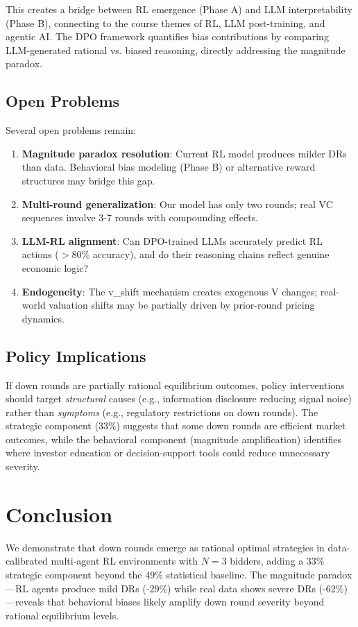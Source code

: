\documentclass[11pt,a4paper]{article}
\begin{document}
This creates a bridge between RL emergence (Phase A) and LLM interpretability (Phase B), connecting to the course themes of RL, LLM post-training, and agentic AI. The DPO framework quantifies bias contributions by comparing LLM-generated rational vs. biased reasoning, directly addressing the magnitude paradox.

\subsection{Open Problems}

Several open problems remain:
\begin{enumerate}[nosep]
  \item \textbf{Magnitude paradox resolution}: Current RL model produces milder DRs than data. Behavioral bias modeling (Phase B) or alternative reward structures may bridge this gap.
  \item \textbf{Multi-round generalization}: Our model has only two rounds; real VC sequences involve 3-7 rounds with compounding effects.
  \item \textbf{LLM-RL alignment}: Can DPO-trained LLMs accurately predict RL actions ($>80\%$ accuracy), and do their reasoning chains reflect genuine economic logic?
  \item \textbf{Endogeneity}: The v\_shift mechanism creates exogenous V changes; real-world valuation shifts may be partially driven by prior-round pricing dynamics.
\end{enumerate}

\subsection{Policy Implications}

If down rounds are partially rational equilibrium outcomes, policy interventions should target \emph{structural} causes (e.g., information disclosure reducing signal noise) rather than \emph{symptoms} (e.g., regulatory restrictions on down rounds). The strategic component (33\%) suggests that some down rounds are efficient market outcomes, while the behavioral component (magnitude amplification) identifies where investor education or decision-support tools could reduce unnecessary severity.

\section{Conclusion}

We demonstrate that down rounds emerge as rational optimal strategies in data-calibrated multi-agent RL environments with $N=3$ bidders, adding a 33\% strategic component beyond the 49\% statistical baseline. The magnitude paradox---RL agents produce mild DRs (-29\%) while real data shows severe DRs (-62\%)---reveals that behavioral biases likely amplify down round severity beyond rational equilibrium levels.
\end{document}
